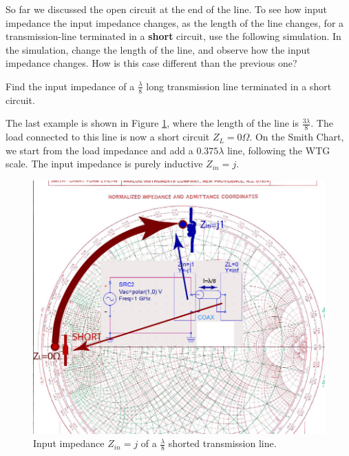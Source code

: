 \documentclass{ximera}
\begin{document}
So far we discussed the open circuit at the end of the line. To see how input impedance the input impedance changes, as the length of the line changes, for a transmission-line terminated in a {\bf short} circuit, use the following simulation. In the simulation, change the length of the line, and observe how the input impedance changes. How is this case different than the previous one?

\begin{center}  
\end{center} 


\begin{example}


Find the input impedance of a $\frac{\lambda}{8}$ long transmission line terminated in a short circuit.

\begin{explanation}
The last example is shown in Figure \ref{fig:ShortedStubLambdaOver8}, where the length of the line is  $\frac{3 \lambda}{8}$. The load connected to this line is now a short circuit $Z_L=0 \Omega$. On the Smith Chart, we start from the load impedance and add a $0.375 \lambda$ line, following the WTG scale. The input impedance is purely inductive $Z_{in}=j$.



\begin{figure}[htbp]
\begin{center}
\includegraphics[scale=1]{../jpg/shortedstub-01.jpg}
\end{center}
\caption{Input impedance $Z_{in}=j$ of a $\frac{\lambda}{8}$ shorted transmission line.}
\label{fig:ShortedStubLambdaOver8}
\end{figure}



\end{explanation}
\end{example}
\end{document}
